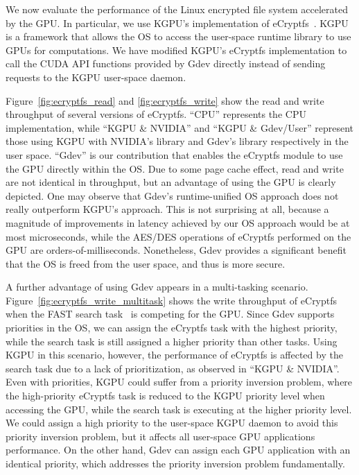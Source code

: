 We now evaluate the performance of the Linux encrypted file system
accelerated by the GPU.
In particular, we use KGPU's implementation of
eCryptfs~\cite{Sun_SYSTOR12}.
KGPU is a framework that allows the OS to access the user-space runtime
library to use GPUs for computations.
We have modified KGPU's eCryptfs implementation to call the CUDA API
functions provided by Gdev directly instead of sending requests to the
KGPU user-space daemon.

Figure~\ref{fig:ecryptfs_read} and \ref{fig:ecryptfs_write} show the
read and write throughput of several versions of eCryptfs.
``CPU'' represents the CPU implementation, while ``KGPU \& NVIDIA'' and
``KGPU \& Gdev/User'' represent those using KGPU with NVIDIA's library
and Gdev's library respectively in the user space. 
``Gdev'' is our contribution that enables the eCryptfs module to use the
GPU directly within the OS.
Due to some page cache effect, read and write are not identical in
throughput, but an advantage of using the GPU is clearly depicted.
One may observe that Gdev's runtime-unified OS approach does not really
outperform KGPU's approach.
This is not surprising at all, because a magnitude of improvements in
latency achieved by our OS approach would be at most microseconds, while
the AES/DES operations of eCryptfs performed on the GPU are
orders-of-milliseconds.
Nonetheless, Gdev provides a significant benefit that the OS is freed
from the user space, and thus is more secure.

A further advantage of using Gdev appears in a multi-tasking scenario.
Figure~\ref{fig:ecryptfs_write_multitask} shows the write throughput of
eCryptfs when the FAST search task~\cite{Kim_SIGMOD10} is competing for
the GPU.
Since Gdev supports priorities in the OS, we can assign the eCryptfs
task with the highest priority, while the search task is still assigned
a higher priority than other tasks.
Using KGPU in this scenario, however, the performance of eCryptfs is
affected by the search task due to a lack of prioritization, as observed
in ``KGPU \& NVIDIA''.
Even with priorities, KGPU could suffer from a priority inversion
problem, where the high-priority eCryptfs task is reduced to the KGPU
priority level when accessing the GPU, while the search task is
executing at the higher priority level.
We could assign a high priority to the user-space KGPU daemon to avoid
this priority inversion problem, but it affects all user-space GPU
applications performance. 
On the other hand, Gdev can assign each GPU application with an
identical priority, which addresses the priority inversion problem
fundamentally.

